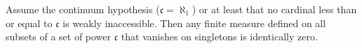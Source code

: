 Assume the continuum hypothesis ($\mathfrak{c} = \aleph_1$) or at least that no cardinal less than or equal to $\mathfrak{c}$ is weakly inaccessible. Then any finite measure defined on all subsets of a set of power $\mathfrak{c}$ that vanishes on singletons is identically zero.
